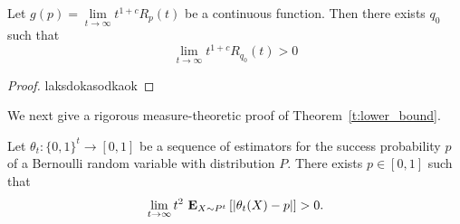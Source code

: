 \begin{theorem}\label{t:continuous}
  Let $g(p) = \lim \limits_{t \to \infty} t^{1+c}R_p(t)$ be a continuous
  function. Then there exists $q_0$ such that
  \[
    \lim \limits_{t \to \infty} t^{1+c}R_{q_0}(t) >0
  \]
\end{theorem}
\begin{proof}
  laksdokasodkaok
\end{proof}

We next give a rigorous measure-theoretic proof of Theorem~\ref{t:lower_bound}.
\begin{theorem}
  Let $\theta_t: \{0,1\}^t \to [0,1]$ be a sequence of estimators for
  the success probability $p$ of a Bernoulli random variable with
  distribution $P$.
  There exists $p \in [0,1]$ such that
  \[
   \lim_{t\to \infty} t^2\ \bm{\mathrm{E}}_{X \sim P^t} \left[ \left| \theta_t(X) - p \right| \right] > 0.
  \]
\end{theorem}
